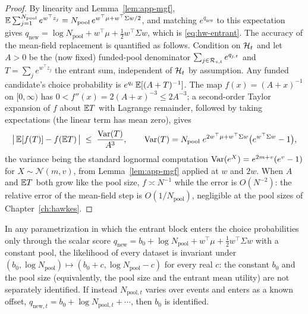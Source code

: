\begin{proof}
By linearity and Lemma~\ref{lem:app-mgf}, $\mathbb{E} \sum_{j=1}^{N_{\mathrm{pool}}} e^{w^\top z_j} =
N_{\mathrm{pool}}\, e^{w^\top \mu + w^\top \Sigma w/2}$, and matching $e^{q_{\mathrm{new}}}$ to this
expectation gives $q_{\mathrm{new}} = \log N_{\mathrm{pool}} + w^\top \mu + \tfrac12 w^\top \Sigma
w$, which is \eqref{eq:hw-entrant}. The accuracy of the mean-field replacement is quantified as
follows. Condition on $\mathcal{H}_t$ and let $A > 0$ be the (now fixed) funded-pool denominator $\sum_{j
\in \mathcal{R}_{s,t}} e^{q_{j,t}}$ and $T = \sum_j e^{w^\top z_j}$ the entrant sum, independent of
$\mathcal{H}_t$ by assumption. Any funded candidate's choice probability is $e^{q_i}\, \mathbb{E}[(A + T)^{-1}]$.
The map $f(x) = (A + x)^{-1}$ on $[0, \infty)$ has $0 < f''(x) = 2 (A+x)^{-3} \le 2 A^{-3}$; a
second-order Taylor expansion of $f$ about $\mathbb{E} T$ with Lagrange remainder, followed by taking
expectations (the linear term has mean zero), gives
\[
\big|\, \mathbb{E}[f(T)] - f(\mathbb{E} T) \,\big| \;\le\; \frac{\mathrm{Var}(T)}{A^3},
\qquad
\mathrm{Var}(T) = N_{\mathrm{pool}}\; e^{2 w^\top\mu + w^\top\Sigma w}\big(e^{w^\top \Sigma w} - 1\big),
\]
the variance being the standard lognormal computation $\mathrm{Var}(e^X) = e^{2m + v}(e^v - 1)$ for $X \sim
\mathcal{N}(m, v)$, from Lemma~\ref{lem:app-mgf} applied at $w$ and $2w$. When $A$ and $\mathbb{E} T$ both
grow like the pool size, $f \asymp N^{-1}$ while the error is $O(N^{-2})$: the relative error of the
mean-field step is $O(1/N_{\mathrm{pool}})$, negligible at the pool sizes of
Chapter~\ref{ch:hawkes}.
\end{proof}

\begin{proposition}
\label{prop:app-poolident}
In any parametrization in which the entrant block enters the choice probabilities only through the
scalar score $q_{\mathrm{new}} = b_0 + \log N_{\mathrm{pool}} + w^\top\mu + \tfrac12 w^\top \Sigma
w$ with a constant pool, the likelihood of every dataset is invariant under $(b_0, \log
N_{\mathrm{pool}}) \mapsto (b_0 + c, \log N_{\mathrm{pool}} - c)$ for every real $c$: the constant
$b_0$ and the pool size (equivalently, the pool size and the entrant mean utility) are not
separately identified. If instead $N_{\mathrm{pool}, t}$ varies over events and enters as a known
offset, $q_{\mathrm{new}, t} = b_0 + \log N_{\mathrm{pool}, t} + \cdots$, then $b_0$ is identified.
\end{proposition}

